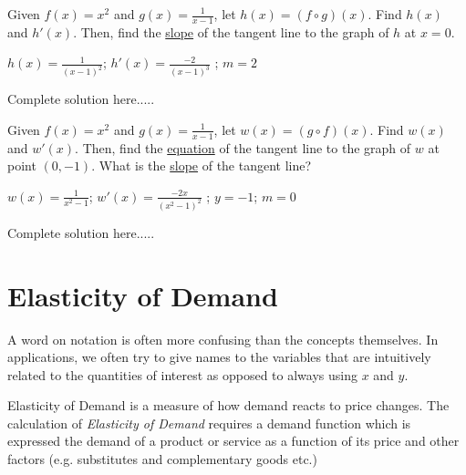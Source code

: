 \begin{example}\label{exGenPowerRule3}
Given $f(x)=x^2$  and $g(x)=\displaystyle\frac{1}{x-1}$, let \(h(x)=(f\circ g)(x)\). Find $h(x)$ and  $h'(x)$. Then, find the \underline{slope} of the tangent line to the graph of $h$ at $x=0$.

    \begin{sol}
    $h(x)=\displaystyle\frac{1}{(x-1)^2}$; $h'(x)=\displaystyle\frac{-2}{(x-1)^3}$ ; $m=2$
    \end{sol}
    \begin{solL}
    Complete solution here.....
    
    \end{solL}
    
\end{example}
\newpage
\begin{example}\label{exGenPowerRule4}
Given $f(x)=x^2$  and $g(x)=\displaystyle\frac{1}{x-1}$, let \(w(x)=(g\circ f)(x)\). Find $w(x)$ and $w'(x)$. Then, find the \underline{equation} of the tangent line to the graph of $w$ at point $(0,-1)$. What is the \underline{slope} of the tangent line?

    \begin{sol}
    $w(x)=\displaystyle\frac{1}{x^2-1}$; $w'(x)=\displaystyle\frac{-2x}{(x^2-1)^2}$ ; $y=-1$; $m=0$
    \end{sol}
    \begin{solL}
    Complete solution here.....
    
    \end{solL}
    
\end{example}
\vspace{2in}
\section*{Elasticity of Demand}

\hspace{\parindent}A word on notation is often more confusing than the concepts themselves.  In applications, we often try to give names to the variables that are intuitively related to the quantities of interest as opposed to always using $x$ and $y$. 

{Elasticity of Demand} is a measure of how demand reacts to price changes. The calculation of \emph{Elasticity of Demand} requires a demand function which is expressed the demand of a product or service as a function of its price and other factors (e.g. substitutes and complementary goods etc.) 

